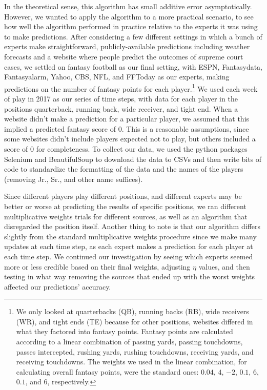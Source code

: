 \documentclass[12pt, final, onecolumn, titlepage]{article}
\theoremstyle{definition}
\begin{document}
In the theoretical sense, this algorithm has small additive error asymptotically. However, we wanted to apply the algorithm to a more practical scenario, to see how well the algorithm performed in practice relative to the experts it was using to make predictions. After considering a few different settings in which a bunch of experts make straightforward, publicly-available predictions including weather forecasts and a website where people predict the outcomes of supreme court cases, we settled on fantasy football as our final setting, with ESPN, Fantasydata, Fantasyalarm, Yahoo, CBS, NFL, and FFToday as our experts, making predictions on the number of fantasy points for each player.\footnote{We only looked at quarterbacks (QB), running backs (RB), wide receivers (WR), and tight ends (TE) because for other positions, websites differed in what they factored into fantasy points. Fantasy points are calculated according to a linear combination of passing yards, passing touchdowns, passes intercepted, rushing yards, rushing touchdowns, receiving yards, and receiving touchdowns. The weights we used in the linear combination, for calculating overall fantasy points, were the standard ones: $0.04$, $4$, $-2$, $0.1$, $6$, $0.1$, and $6$, respectively.} We used each week of play in 2017 as our series of time steps, with data for each player in the positions quarterback, running back, wide receiver, and tight end. When a website didn't make a prediction for a particular player, we assumed that this implied a predicted fantasy score of 0. This is a reasonable assumptions, since some websites didn't include players expected not to play, but others included a score of 0 for completeness. To collect our data, we used the python packages Selenium and BeautifulSoup to download the data to CSVs and then write bits of code to standardize the formatting of the data and the names of the players (removing Jr., Sr., and other name suffices).

Since different players play different positions, and different experts may be better or worse at predicting the results of specific positions, we ran different multiplicative weights trials for different sources, as well as an algorithm that disregarded the position itself. Another thing to note is that our algorithm differs slightly from the standard multiplicative weights procedure since we make many updates at each time step, as each expert makes a prediction for each player at each time step. We continued our investigation by seeing which experts seemed more or less credible based on their final weights, adjusting $\eta$ values, and then testing in what way removing the sources that ended up with the worst weights affected our predictions' accuracy.
\end{document}
